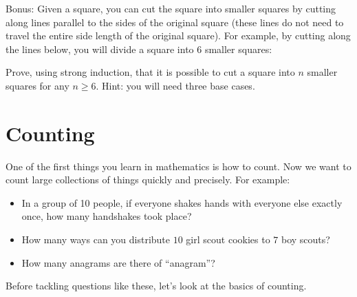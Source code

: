 \documentclass[11pt,]{book}
\theoremstyle{ptxplainnotitle}
\theoremstyle{ptxplaintitle}
\theoremstyle{ptxdefinitionnotitle}
\theoremstyle{ptxdefinitiontitle}
\theoremstyle{ptxdefinitionnotitle}
\theoremstyle{ptxdefinitiontitle}
\theoremstyle{ptxdefinitionnotitle}
\theoremstyle{ptxdefinitiontitle}
\theoremstyle{ptxdefinitiontitlenonumber}
\theoremstyle{ptxdefinitiontitlenonumber}
\numberwithin{equation}{chapter}
\begin{document}
\begin{divisionexercise}{24}\hypertarget{exercise-77}{}
\hypertarget{p-651}{}%
Bonus: Given a square, you can cut the square into smaller squares by cutting along lines parallel to the sides of the original square (these lines do not need to travel the entire side length of the original square).  For example, by cutting along the lines below, you will divide a square into 6 smaller squares:%
\begin{sidebyside}{1}{0.325}{0.325}{0}
\begin{sbspanel}{0.35}
\end{sbspanel}
\end{sidebyside}
\par
\hypertarget{p-652}{}%
Prove, using strong induction, that it is possible to cut a square into \(n\) smaller squares for any \(n \ge 6\).  Hint: you will need three base cases.%
\end{divisionexercise}%
\typeout{************************************************}
\typeout{************************************************}
\chapter[{Counting}]{Counting}\label{ch_counting}
\hypertarget{p-657}{}%
One of the first things you learn in mathematics is how to count. Now we want to count large collections of things quickly and precisely. For example: \leavevmode%
\begin{itemize}[label=\textbullet]
\item{}\hypertarget{p-658}{}%
In a group of 10 people, if everyone shakes hands with everyone else exactly once, how many handshakes took place?%
\item{}\hypertarget{p-659}{}%
How many ways can you distribute \(10\) girl scout cookies to \(7\) boy scouts?%
\item{}\hypertarget{p-660}{}%
How many anagrams are there of ``anagram''?%
\end{itemize}
%
\par
\hypertarget{p-661}{}%
Before tackling questions like these, let's look at the basics of counting.%
\typeout{************************************************}
\typeout{************************************************}
\end{document}
